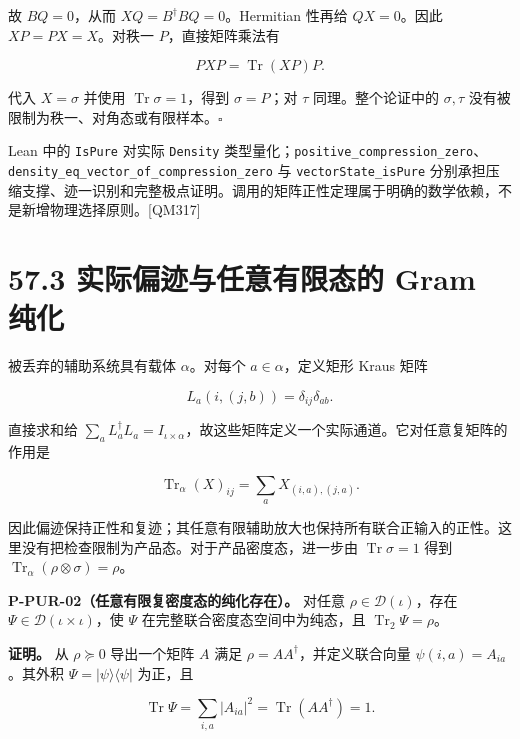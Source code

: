 \documentclass[
  11pt,
  oneside]{book}
\begin{document}
故 \(BQ=0\)，从而 \(XQ=B^\dagger BQ=0\)。Hermitian 性再给 \(QX=0\)。因此
\(XP=PX=X\)。对秩一 \(P\)，直接矩阵乘法有

\[
PXP=\operatorname{Tr}(XP)P.
\]

代入 \(X=\sigma\) 并使用 \(\operatorname{Tr}\sigma=1\)，得到
\(\sigma=P\)；对 \(\tau\) 同理。整个论证中的 \(\sigma,\tau\)
没有被限制为秩一、对角态或有限样本。\(\square\)

Lean 中的 \texttt{IsPure} 对实际 \texttt{Density}
类型量化；\texttt{positive\_\allowbreak compression\_\allowbreak zero}、\allowbreak \texttt{density\_\allowbreak eq\_\allowbreak vector\_\allowbreak of\_\allowbreak compression\_\allowbreak zero}
与 \texttt{vectorState\_\allowbreak isPure}
分别承担压缩支撑、迹一识别和完整极点证明。调用的矩阵正性定理属于明确的数学依赖，不是新增物理选择原则。{[}QM317{]}

\hypertarget{ux5b9eux9645ux504fux8ff9ux4e0eux4efbux610fux6709ux9650ux6001ux7684-gram-ux7eafux5316}{%
\section{57.3 实际偏迹与任意有限态的 Gram
纯化}\label{ux5b9eux9645ux504fux8ff9ux4e0eux4efbux610fux6709ux9650ux6001ux7684-gram-ux7eafux5316}}

被丢弃的辅助系统具有载体 \(\alpha\)。对每个 \(a\in\alpha\)，定义矩形
Kraus 矩阵

\[
L_a(i,(j,b))=\delta_{ij}\delta_{ab}.
\]

直接求和给
\(\sum_aL_a^\dagger L_a=I_{\iota\times\alpha}\)，故这些矩阵定义一个实际通道。它对任意复矩阵的作用是

\[
\operatorname{Tr}_{\alpha}(X)_{ij}
=\sum_aX_{(i,a),(j,a)}.
\]

因此偏迹保持正性和复迹；其任意有限辅助放大也保持所有联合正输入的正性。这里没有把检查限制为产品态。对于产品密度态，进一步由
\(\operatorname{Tr}\sigma=1\) 得到
\(\operatorname{Tr}_{\alpha}(\rho\otimes\sigma)=\rho\)。

\protect\hypertarget{p-pur-02}{}{}

\textbf{P-PUR-02（任意有限复密度态的纯化存在）。} 对任意
\(\rho\in\mathcal D(\iota)\)，存在
\(\Psi\in\mathcal D(\iota\times\iota)\)，使 \(\Psi\)
在完整联合密度态空间中为纯态，且 \(\operatorname{Tr}_{2}\Psi=\rho\)。

\textbf{证明。} 从 \(\rho\succeq0\) 导出一个矩阵 \(A\) 满足
\(\rho=AA^\dagger\)，并定义联合向量 \(\psi(i,a)=A_{ia}\)。其外积
\(\Psi=|\psi\rangle\langle\psi|\) 为正，且

\[
\operatorname{Tr}\Psi
=\sum_{i,a}|A_{ia}|^2
=\operatorname{Tr}(AA^\dagger)=1.
\]
\end{document}

